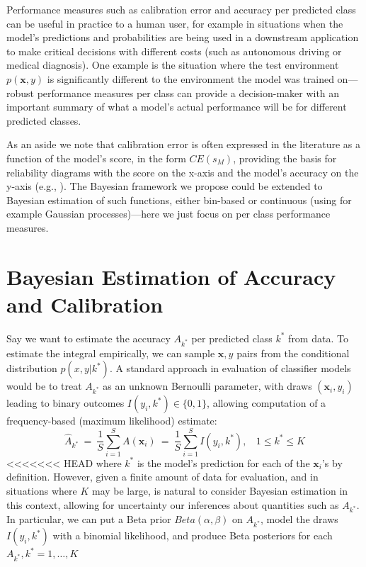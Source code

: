 \documentclass{article}
\newcommand{\ux}{{\mathbf{x}}}
\begin{document}
Performance measures such as calibration error and accuracy per predicted class can be useful in practice to a human user, for example in situations  when the model's predictions and probabilities are being used in a downstream application to make critical decisions with different costs (such as autonomous driving or medical diagnosis).
One example is the situation where the test environment $p(\ux,y)$ is significantly different to the environment the model was trained on---robust performance measures per class can provide a decision-maker with an important summary of what a model's actual performance will be for different predicted classes.

As an aside we note that calibration error is often expressed in the literature as a function of the model's score, in the form $CE(s_M)$, providing the basis for reliability diagrams with the score on the x-axis and the model's accuracy on the y-axis (e.g., \cite{guo2017calibration}).
The Bayesian framework we propose could be extended to Bayesian estimation of such functions, either bin-based or continuous (using for example Gaussian processes)---here we just focus on per class performance measures.


\section{Bayesian Estimation of Accuracy and Calibration}\label{sec:bayesian}
Say we want to estimate the accuracy ${A}_{k^*}$ per predicted class $k^*$ from data. To estimate the integral empirically, we can sample $\ux,y$ pairs from the conditional distribution $p(x,y | k^*)$.
A standard approach in evaluation of classifier models would be to treat ${A}_{k^*}$ as an unknown Bernoulli parameter, with draws $(\ux_i,y_i)$ leading to binary outcomes $I(y_i, k^*) \in \{0,1\}$, allowing computation of a frequency-based (maximum likelihood) estimate:
\[
\hat{A}_{k^*} \ = \  \frac{1}{S} \sum_{i=1}^S A(\ux_i)
 \ = \ \frac{1}{S} \sum_{i=1}^S I(y_i, k^*), \ \ \ \ 1 \le k^* \le K
\]
<<<<<<< HEAD
where $k^*$ is the model's prediction for each of the $\ux_i$'s by definition.
However, given a finite amount of data for evaluation, and in situations where $K$ may be large, is natural to consider Bayesian estimation in this context, allowing for  uncertainty our inferences about quantities such as ${A}_{k^*}$.
In particular, we can put a Beta prior $Beta(\alpha, \beta)$ on ${A}_{k^*}$, model the draws $I(y_i, k^*)$ with a binomial likelihood, and produce Beta posteriors for each ${A}_{k^*}, k^* = 1,\ldots,K$
\end{document}

